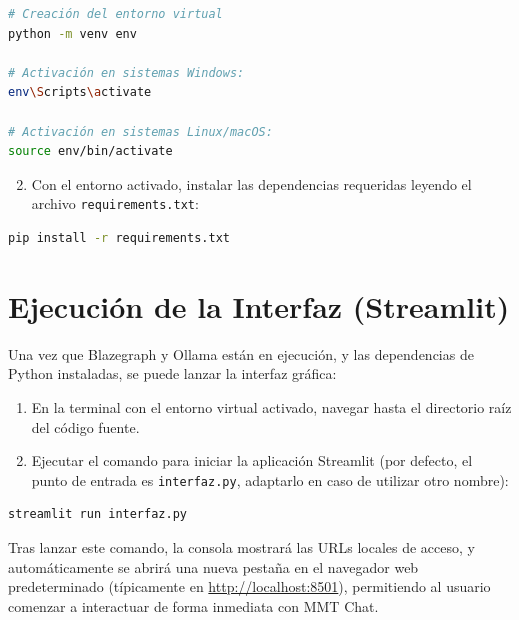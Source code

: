 \begin{lstlisting}[language=bash]
# Creación del entorno virtual
python -m venv env

# Activación en sistemas Windows:
env\Scripts\activate

# Activación en sistemas Linux/macOS:
source env/bin/activate
\end{lstlisting}

\begin{enumerate}
    \setcounter{enumi}{1}
    \item Con el entorno activado, instalar las dependencias requeridas leyendo el archivo \texttt{requirements.txt}:
\end{enumerate}

\begin{lstlisting}[language=bash]
pip install -r requirements.txt
\end{lstlisting}

\section{Ejecución de la Interfaz (Streamlit)}

Una vez que Blazegraph y Ollama están en ejecución, y las dependencias de Python instaladas, se puede lanzar la interfaz gráfica:

\begin{enumerate}
    \item En la terminal con el entorno virtual activado, navegar hasta el directorio raíz del código fuente.
    \item Ejecutar el comando para iniciar la aplicación Streamlit (por defecto, el punto de entrada es \texttt{interfaz.py}, adaptarlo en caso de utilizar otro nombre):
\end{enumerate}

\begin{lstlisting}[language=bash]
streamlit run interfaz.py
\end{lstlisting}

Tras lanzar este comando, la consola mostrará las URLs locales de acceso, y automáticamente se abrirá una nueva pestaña en el navegador web predeterminado (típicamente en \url{http://localhost:8501}), permitiendo al usuario comenzar a interactuar de forma inmediata con MMT Chat.